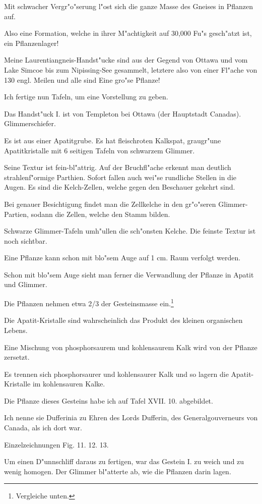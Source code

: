 \documentclass[a4paper, 11pt, oneside, german]{article}
\begin{document}
Mit schwacher Vergr"o"serung l"ost sich die ganze Masse des Gneises in Pflanzen auf.

Also eine Formation, welche in ihrer M"achtigkeit auf 30,000 Fu"s gesch"atzt ist, ein Pflanzenlager!

Meine Laurentiangneis-Handst"ucke sind aus der Gegend von Ottawa und vom Lake Simcoe bis zum Nipissing-See gesammelt, letztere also von einer Fl"ache von 130 engl. Meilen und alle sind Eine gro"se Pflanze!

Ich fertige nun Tafeln, um eine Vorstellung zu geben.

Das Handst"uck I. ist von Templeton bei Ottawa (der Hauptstadt Canadas). Glimmerschiefer.

Es ist aus einer Apatitgrube. Es hat fleischroten Kalkspat, graugr"une Apatitkristalle mit 6 seitigen Tafeln von schwarzem Glimmer.

Seine Textur ist fein-bl"attrig. Auf der Bruchfl"ache erkennt man deutlich strahlenf"ormige Parthien. Sofort fallen auch wei"se rundliche Stellen in die Augen. Es sind die Kelch-Zellen, welche gegen den Beschauer gekehrt sind.

Bei genauer Besichtigung findet man die Zellkelche in den gr"o"seren Glimmer-Partien, sodann die Zellen, welche den Stamm bilden.

Schwarze Glimmer-Tafeln umh"ullen die sch"onsten Kelche. Die feinste Textur ist noch sichtbar.

Eine Pflanze kann schon mit blo"sem Auge auf 1 cm. Raum verfolgt werden.

Schon mit blo"sem Auge sieht man ferner die Verwandlung der Pflanze in Apatit und Glimmer.

Die Pflanzen nehmen etwa 2/3 der Gesteinsmasse ein.\footnote{Vergleiche unten.}

Die Apatit-Kristalle sind wahrscheinlich das Produkt des kleinen organischen Lebens.

Eine Mischung von phosphorsaurem und kohlensaurem Kalk wird von der Pflanze zersetzt.

Es trennen sich phosphorsaurer und kohlensaurer Kalk und so lagern die Apatit-Kristalle im kohlensauren Kalke.

Die Pflanze dieses Gesteins habe ich auf Tafel XVII. 10. abgebildet.

Ich nenne sie Dufferinia zu Ehren des Lords Dufferin, des Generalgouverneurs von Canada, als ich dort war.

Einzelzeichnungen Fig. 11. 12. 13.

Um einen D"unnschliff daraus zu fertigen, war das Gestein I. zu weich und zu wenig homogen. Der Glimmer bl"atterte ab, wie die Pflanzen darin lagen.
\end{document}
